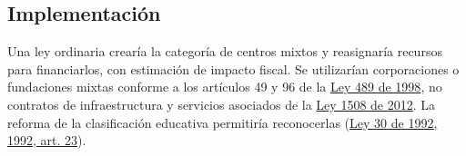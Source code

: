 
\subsection{Implementación}

Una ley ordinaria crearía la categoría de centros mixtos y reasignaría recursos para financiarlos, con estimación de impacto fiscal. Se utilizarían corporaciones o fundaciones mixtas conforme a los artículos 49 y 96 de la \href{https://www.funcionpublica.gov.co/eva/gestornormativo/norma.php?i=186}{Ley 489 de 1998}, no contratos de infraestructura y servicios asociados de la \href{https://normograma.sena.edu.co/compilacion/docs/ley_1508_2012.htm}{Ley 1508 de 2012}. La reforma de la clasificación educativa permitiría reconocerlas (\href{https://normograma.sena.edu.co/compilacion/docs/ley_0030_1992.htm}{Ley 30 de 1992, 1992, art. 23}).

